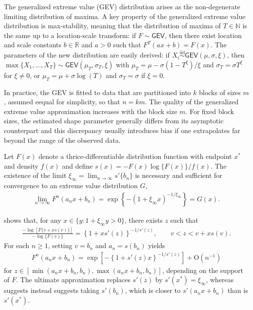 \documentclass[]{book}
\begin{document}
The generalized extreme value (GEV) distribution arises as the non-degenerate limiting distribution of maxima. A key property of the generalized extreme value distribution is max-stability, meaning that the distribution of maxima of \(T \in \mathbb{N}\) is the same up to a location-scale transform: if \(F \sim \mathsf{GEV}\), then there exist location and scale constants \(b \in \mathbb{R}\) and \(a>0\) such that \(F^T(ax+b) = F(x)\). The parameters of the new distribution are easily derived: if \(X_i \stackrel{\mathrm{iid}}{\sim}\mathsf{GEV}(\mu,\sigma, \xi)\), then \(\max\{X_1, \ldots, X_T\} \sim \mathsf{GEV}(\mu_T, \sigma_T, \xi)\) with \(\mu_T = \mu - \sigma(1-T^\xi)/\xi\) and \(\sigma_T = \sigma T^\xi\) for \(\xi \neq 0\), or \(\mu_T = \mu +\sigma \log(T)\) and \(\sigma_T = \sigma\) if \(\xi=0\).

In practice, the GEV is fitted to data that are partitioned into \(k\) blocks of sizes \(m\), assumed eequal for simplicity, so that \(n = km\). The quality of the generalized extreme value approximation increases with the block size \(m\). For fixed block sizes, the estimated shape parameter generally differs from its asymptotic counterpart and this discrepancy usually introduces bias if one extrapolates far beyond the range of the observed data.

Let \(F(x)\) denote a thrice-differentiable distribution function with endpoint \(x^*\) and density \(f(x)\) and define \(s(x)=-F(x)\log\{F(x)\}/f(x)\). The existence of the limit \(\xi_{\infty} = \lim_{n \to \infty} s'\{b_n\}\) is necessary and sufficient for convergence to an extreme value distribution \(G\),
\begin{align*}
 \lim_{n \to \infty} F^n(a_nx+b_n) = \exp\left\{-(1+\xi_\infty x)^{-1/\xi_\infty}\right\}=G(x).
\end{align*}

\citet{Smith:1987} shows that, for any \(x \in \{y:1+\xi_\infty y >0\}\), there exists \(z\) such that
\begin{align*}
   \frac{-\log[F\{v+xs(v)\}]}{-\log\{F(v)\}} = \left\{1+xs'(z)\right\}^{-1/s'(z)}, \qquad v < z < v+xs(v).
\end{align*}
For each \(n \geq 1\), setting \(v=b_n\) and \(a_n=s(b_n)\) yields
\begin{align*}
   F^n(a_nx+b_n)=\exp\left[-\left\{1+s'(z)x\right\}^{-1/s'(z)}\right] + \mathrm{O}(n^{-1})
\end{align*}
for \(z \in [\min(a_nx+b_n, b_n), \max(a_nx+b_n, b_n)]\), depending on the support of \(F\). The ultimate approximation replaces \(s'(z)\) by \(s'(x^*)=\xi_{\infty}\), whereas \citet{Smith:1987} suggests instead suggests taking \(s'(b_n)\), which is closer to \(s'(a_nx+b_n)\) than is \(s'(x^*)\).
\end{document}
